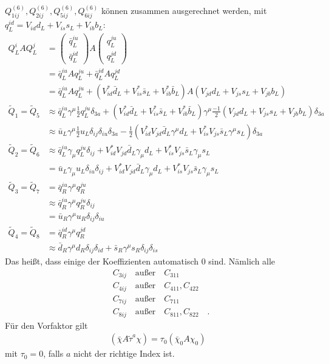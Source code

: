 $Q_{1ij}^{(6)},Q_{2ij}^{(6)},Q_{5ij}^{(6)},Q_{6ij}^{(6)}$ können zusammen ausgerechnet werden, mit $q_L^{id} = V_{id}d_L+V_{is}s_L+V_{ib}b_L$:
\begin{align*}
	Q_L^iAQ_L^j &= \begin{pmatrix}
		\bar{q}_L^{iu} \\ \bar{q}_L^{id}
	\end{pmatrix}
	A \begin{pmatrix}
		q_L^{ju} \\ q_L^{jd}
	\end{pmatrix} \\
	&= \bar{q}_L^{iu}Aq_L^{ju} + \bar{q}_L^{id}Aq_L^{jd} \\
	&= \bar{q}_L^{iu}Aq_L^{ju} + (V_{id}^*\bar{d}_L + V_{is}^*\bar{s}_L+V_{ib}^*\bar{b}_L)A(V_{jd}d_L+V_{js}s_L+V_{jb}b_L) \\
	\tilde{Q}_1 = \tilde{Q}_5 &\approx \bar{q}_L^{iu}\gamma^\mu \frac{1}{2}q_L^{ju}\delta_{3a}
	+ (V_{id}^*\bar{d}_L + V_{is}^*\bar{s}_L+V_{ib}^*\bar{b}_L)\gamma^\mu \frac{-1}{2}(V_{jd}d_L+V_{js}s_L+V_{jb}b_L)\delta_{3a} \\
	&\approx \bar{u}_L\gamma^\mu \frac{1}{2}u_L\delta_{ij}\delta_{iu}\delta_{3a}
	 - \frac{1}{2}(V_{id}^*V_{jd}\bar{d}_L\gamma^\mu d_L + V_{is}^*V_{js}\bar{s}_L\gamma^\mu s_L)\delta_{3a} \\
%
	\tilde{Q}_2 = \tilde{Q}_6 &\approx \bar{q}_L^{iu}\gamma_\mu q_L^{ju}\delta_{ij} + V_{id}^*V_{jd}\bar{d}_L\gamma_\mu d_L + V_{is}^*V_{js}\bar{s}_L\gamma_\mu s_L \\
	&= \bar{u}_L\gamma_\mu u_L\delta_{iu}\delta_{ij} + V_{id}^*V_{jd}\bar{d}_L\gamma_\mu d_L + V_{is}^*V_{js}\bar{s}_L\gamma_\mu s_L \\
	\tilde{Q}_3 = \tilde{Q}_7 &= \bar{q}_R^{iu}\gamma^\mu q_R^{ju} \\
	&\approx \bar{q}_R^{iu}\gamma^\mu q_R^{ju}\delta_{ij} \\
	&= \bar{u}_R\gamma^\mu u_R\delta_{ij}\delta_{iu} \\
	\tilde{Q}_4 = \tilde{Q}_8 &= \bar{q}_R^{id}\gamma^\mu q_R^{jd} \\
	&\approx \bar{d}_R\gamma^\mu d_R\delta_{ij}\delta_{id} + \bar{s}_R\gamma^\mu s_R\delta_{ij}\delta_{is}
\end{align*}
Das heißt, dass einige der Koeffizienten automatisch 0 sind. Nämlich alle
\begin{align*}
	&C_{3ij} \quad\text{außer}\quad C_{311} \\
	&C_{4ij} \quad\text{außer}\quad C_{411},C_{422} \\
	&C_{7ij} \quad\text{außer}\quad C_{711} \\
	&C_{8ij} \quad\text{außer}\quad C_{811},C_{822} \quad.
\end{align*}
Für den Vorfaktor gilt
\begin{align*}
	(\bar{\chi}A\tilde{\tau}^a\chi) = \tau_{0}(\bar{\chi}_0A\chi_0)
\end{align*}
mit $\tau_{0}=0$, falls $a$ nicht der richtige Index ist.